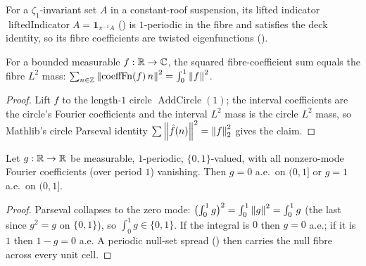 For a $\zeta_1$-invariant set $A$ in a constant-roof suspension, its lifted indicator
$\operatorname{liftedIndicator} A = \mathbf 1_{\pi^{-1}A}$ () is
$1$-periodic in the fibre and satisfies the deck identity, so its fibre coefficients are twisted
eigenfunctions ().

\begin{theorem}\label{thm:susp-parseval}
  \leanok
  For a bounded measurable $f : \mathbb{R} \to \mathbb{C}$, the squared fibre-coefficient sum equals the fibre
  $L^2$ mass: $\sum_{n \in \mathbb{Z}}\left\lVert \operatorname{coeffFn}(f)\,n \right\rVert^2 = \int_0^1\left\lVert f \right\rVert^2$.
\end{theorem}
\begin{proof}\leanok
  Lift $f$ to the length-$1$ circle $\operatorname{AddCircle}(1)$; the interval coefficients are the
  circle's Fourier coefficients and the interval $L^2$ mass is the circle $L^2$ mass, so Mathlib's
  circle Parseval identity $\sum\left\lVert \hat f(n) \right\rVert^2 = \left\lVert f \right\rVert_2^2$ gives the claim.
\end{proof}

\begin{theorem}\label{thm:susp-dichotomy}
  \leanok
  Let $g : \mathbb{R} \to \mathbb{R}$ be measurable, $1$-periodic, $\{0, 1\}$-valued, with all nonzero-mode Fourier
  coefficients (over period $1$) vanishing. Then $g = 0$ a.e.\ on $(0, 1]$ or $g = 1$ a.e.\ on
  $(0, 1]$.
\end{theorem}
\begin{proof}\leanok
  Parseval collapses to the zero mode: $\bigl(\int_0^1 g\bigr)^2 = \int_0^1\left\lVert g \right\rVert^2 = \int_0^1 g$
  (the last since $g^2 = g$ on $\{0, 1\}$), so $\int_0^1 g \in \{0, 1\}$. If the integral is $0$ then
  $g = 0$ a.e.; if it is $1$ then $1 - g = 0$ a.e. A periodic null-set spread
  () then carries the null fibre across every
  unit cell.
\end{proof}

